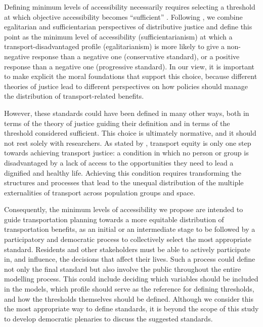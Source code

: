 \documentclass[preprint, 3p,
authoryear]{elsarticle} %
\begin{document}
Defining minimum levels of accessibility necessarily requires selecting
a threshold at which objective accessibility becomes ``sufficient''
\citep{martens2016}. Following \citet{pereira2021}, we combine
egalitarian and sufficientarian perspectives of distributive justice and
define this point as the minimum level of accessibility
(sufficientarianism) at which a transport-disadvantaged profile
(egalitarianism) is more likely to give a non-negative response than a
negative one (conservative standard), or a positive response than a
negative one (progressive standard). In our view, it is important to
make explicit the moral foundations that support this choice, because
different theories of justice lead to different perspectives on how
policies should manage the distribution of transport-related benefits.

However, these standards could have been defined in many other ways,
both in terms of the theory of justice guiding their definition and in
terms of the threshold considered sufficient. This choice is ultimately
normative, and it should not rest solely with researchers. As stated by
\citet{karner2020}, transport equity is only one step towards achieving
transport justice: a condition in which no person or group is
disadvantaged by a lack of access to the opportunities they need to lead
a dignified and healthy life. Achieving this condition requires
transforming the structures and processes that lead to the unequal
distribution of the multiple externalities of transport across
population groups and space.

Consequently, the minimum levels of accessibility we propose are
intended to guide transportation planning towards a more equitable
distribution of transportation benefits, as an initial or an
intermediate stage to be followed by a participatory and democratic
process to collectively select the most appropriate standard. Residents
and other stakeholders must be able to actively participate in, and
influence, the decisions that affect their lives. Such a process could
define not only the final standard but also involve the public
throughout the entire modelling process. This could include deciding
which variables should be included in the models, which profile should
serve as the reference for defining thresholds, and how the thresholds
themselves should be defined. Although we consider this the most
appropriate way to define standards, it is beyond the scope of this
study to develop democratic plenaries to discuss the suggested
standards.
\end{document}
